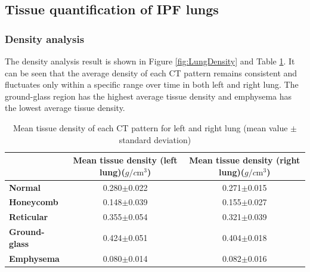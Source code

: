 
\subsection{Tissue quantification of IPF lungs}
\subsubsection{Density analysis}
The density analysis result is shown in Figure \ref{fig:LungDensity} and Table \ref{tab:MeanDensity}. It can be seen that the average density of each CT pattern remains consistent and fluctuates only within a specific range over time in both left and right lung. The ground-glass region has the highest average tissue density and emphysema has the lowest average tissue density. 

\begin{table}[htbp]
\centering
\caption{Mean tissue density of each CT pattern for left and right lung (mean value $\pm$ standard deviation)}
\label{tab:MeanDensity}
\begin{tabular}{|l | c | c|}
\hline
& \bf{Mean tissue density (left lung)($g/c\mathrm{m^3}$)} & \bf{Mean tissue density (right lung)($g/c\mathrm{m^3}$)} \\ 
\hline
\bf{Normal} & 0.280$\pm$0.022 & 0.271$\pm$0.015 \\
\hline
\bf{Honeycomb} & 0.148$\pm$0.039 & 0.155$\pm$0.027 \\
\hline
\bf{Reticular} & 0.355$\pm$0.054 & 0.321$\pm$0.039 \\
\hline
\bf{Ground-glass} & 0.424$\pm$0.051 & 0.404$\pm$0.018 \\
\hline
\bf{Emphysema} & 0.080$\pm$0.014 & 0.082$\pm$0.016 \\
\hline
\end{tabular}
\end{table}

